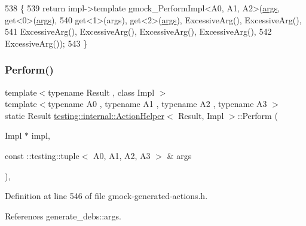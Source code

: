 \begin{DoxyCode}
538                                                                           \{
539     \textcolor{keywordflow}{return} impl->template gmock\_PerformImpl<A0, A1, A2>(\hyperlink{namespacegenerate__debs_a75f9143e38df82d83b2e8a6f99cae02c}{args}, get<0>(\hyperlink{namespacegenerate__debs_a75f9143e38df82d83b2e8a6f99cae02c}{args}),
540         get<1>(args), get<2>(\hyperlink{namespacegenerate__debs_a75f9143e38df82d83b2e8a6f99cae02c}{args}), ExcessiveArg(), ExcessiveArg(),
541         ExcessiveArg(), ExcessiveArg(), ExcessiveArg(), ExcessiveArg(),
542         ExcessiveArg());
543   \}
\end{DoxyCode}
\mbox{\label{classtesting_1_1internal_1_1ActionHelper_a2ceda08aeb7b9fd1ad6ccb0821a3ea39}} 
\subsubsection{\texorpdfstring{Perform()}{Perform()}\hspace{0.1cm}{\footnotesize\ttfamily [5/11]}}
{\footnotesize\ttfamily template$<$typename Result , class Impl $>$ \\
template$<$typename A0 , typename A1 , typename A2 , typename A3 $>$ \\
static Result \hyperlink{classtesting_1_1internal_1_1ActionHelper}{testing\+::internal\+::\+Action\+Helper}$<$ Result, Impl $>$\+::Perform (\begin{DoxyParamCaption}\item[{Impl $\ast$}]{impl,  }\item[{const \+::testing\+::tuple$<$ A0, A1, A2, A3 $>$ \&}]{args }\end{DoxyParamCaption})\hspace{0.3cm}{\ttfamily [inline]}, {\ttfamily [static]}}



Definition at line 546 of file gmock-\/generated-\/actions.\+h.



References generate\+\_\+debs\+::args.


